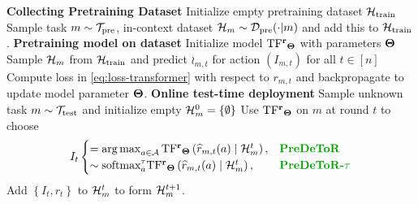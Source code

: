 \documentclass[10pt]{article}
\theoremstyle{plain}
\theoremstyle{definition}
\theoremstyle{remark}
\begin{document}
\begin{algorithm}[!tbh]
\caption{\textbf{Pre}-trained \textbf{De}cision \textbf{T}ransf\textbf{o}rmer with \textbf{R}eward Estimation (\pred)}
\label{alg:pred}
    \begin{algorithmic}[1]
    \STATE \textbf{Collecting Pretraining Dataset}
    \STATE Initialize empty pretraining dataset $\mathcal{H}_{\text{train}}$
    \STATE Sample task $m \sim \mathcal{T}_{\text{pre}}$, in-context dataset $\mathcal{H}_m \sim \mathcal{D}_{\text{pre}}(\cdot | m)$ and add this to $\mathcal{H}_{\text{train}}$.
    \ENDFOR
    \STATE \textbf{Pretraining model on dataset}
    \STATE Initialize model $\mathrm{TF^{\mathbf{r}}}_{\mathbf{\Theta}}$ with parameters $\mathbf{\Theta}$
    \STATE Sample $\mathcal{H}_m$ from $\mathcal{H}_{\text{train}}$ and predict $\wr_{m,t}$ for action $(I_{m,t})$ for all $t \in[n]$
    \STATE Compute loss in \eqref{eq:loss-transformer} with respect to $r_{m,t}$ and backpropagate to update model parameter $\mathbf{\Theta}$.
    \ENDWHILE
    \STATE \textbf{Online test-time deployment}
    \STATE Sample unknown task $m \sim \mathcal{T}_{\text{test}}$ and initialize empty $\mathcal{H}_m^{0}=\{\emptyset\}$
    \STATE Use $\mathrm{TF^{\mathbf{r}}}_{\mathbf{\Theta}}$ on $m$ at round $t$ to choose
    \begin{align*}
        I_t \begin{cases}
            = \argmax_{a\in\A} \rT_{\bTheta}\left( \wr_{m,t}(a) \mid \H^t_m\right), & \textbf{\pred} \\
            \sim \textrm{softmax}^\tau_a \rT_{\bTheta}\left( \wr_{m,t}(a) \mid \H^t_m\right), & \textbf{\predt}
        \end{cases}
    \end{align*}
    \STATE Add $\left\{I_t, r_t\right\}$ to $\mathcal{H}_m^t$ to form $\mathcal{H}_m^{t+1}$.
    \ENDFOR
    \end{algorithmic}
\end{algorithm}
\vspace*{-0.5em}
\vspace*{-0.3em}
\end{document}

